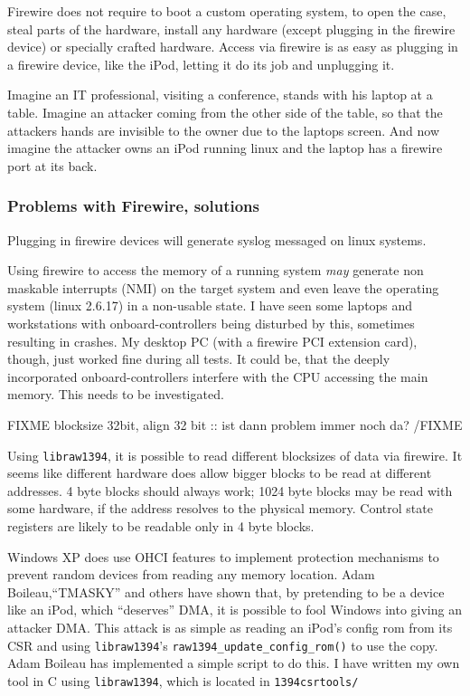Firewire does not require to boot a custom operating system, to open the case,
steal parts of the hardware, install any hardware (except plugging in the
firewire device) or specially crafted hardware.  Access via firewire is as easy
as plugging in a firewire device, like the iPod, letting it do its job and
unplugging it.

Imagine an IT professional, visiting a conference, stands with his laptop at a
table.  Imagine an attacker coming from the other side of the table, so that the
attackers hands are invisible to the owner due to the laptops screen. And now
imagine the attacker owns an iPod running linux and the laptop has a firewire
port at its back.



\subsubsection{Problems with Firewire, solutions}

Plugging in firewire devices will generate syslog messaged on linux systems.

Using firewire to access the memory of a running system \emph{may} generate non
maskable interrupts (NMI) on the target system and even leave the operating
system (linux 2.6.17) in a non-usable state. I have seen some laptops and
workstations with onboard-controllers being disturbed by this, sometimes
resulting in crashes. My desktop PC (with a firewire PCI extension card),
though, just worked fine during all tests. It could be, that the deeply
incorporated onboard-controllers interfere with the CPU accessing the main
memory. This needs to be investigated.

FIXME blocksize 32bit, align 32 bit :: ist dann problem immer noch da? /FIXME

Using \texttt{libraw1394}, it is possible to read different blocksizes of data
via firewire.  It seems like different hardware does allow bigger blocks to be
read at different addresses. 4 byte blocks should always work; 1024 byte blocks
may be read with some hardware, if the address resolves to the physical memory.
Control state registers are likely to be readable only in 4 byte blocks.

\label{windows-dma} Windows XP does use OHCI features to implement protection
mechanisms to prevent random devices from reading any memory location.  Adam
Boileau,``TMASKY'' and others have shown \cite{rux2k6firewire:2006} that, by
pretending to be a device like an iPod, which ``deserves'' DMA, it is possible
to fool Windows into giving an attacker DMA.  This attack is as simple as
reading an iPod's config rom from its CSR and using \texttt{libraw1394}'s
\texttt{raw1394\_update\_config\_rom()} to use the copy.  Adam Boileau has
implemented a simple script to do this. I have written my own tool in C using
\texttt{libraw1394}, which is located in \texttt{1394csrtools/}



